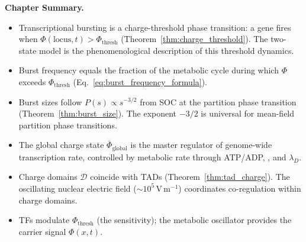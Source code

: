 \begin{chapterbox}
\textbf{Chapter Summary.}
\begin{itemize}
  \item Transcriptional bursting is a charge-threshold phase transition:
        a gene fires when $\Phi(\text{locus},t) > \Phi_{\mathrm{thresh}}$
        (Theorem~\ref{thm:charge_threshold}). The two-state model is the
        phenomenological description of this threshold dynamics.
  \item Burst frequency equals the fraction of the metabolic cycle during
        which $\Phi$ exceeds $\Phi_{\mathrm{thresh}}$
        (Eq.~\eqref{eq:burst_frequency_formula}).
  \item Burst sizes follow $P(s) \propto s^{-3/2}$ from SOC at the partition
        phase transition (Theorem~\ref{thm:burst_size}). The exponent $-3/2$
        is universal for mean-field partition phase transitions.
  \item The global charge state $\bar\Phi_{\mathrm{global}}$ is the master
        regulator of genome-wide transcription rate, controlled by metabolic
        rate through ATP/ADP, , and $\lambda_D$.
  \item Charge domains $\mathcal{D}$ coincide with TADs (Theorem~\ref{thm:tad_charge}).
        The oscillating nuclear electric field ($\sim 10^5$\,V\,m$^{-1}$)
        coordinates co-regulation within charge domains.
  \item TFs modulate $\Phi_{\mathrm{thresh}}$ (the sensitivity); the
        metabolic oscillator provides the carrier signal $\Phi(x,t)$.
\end{itemize}
\end{chapterbox}
